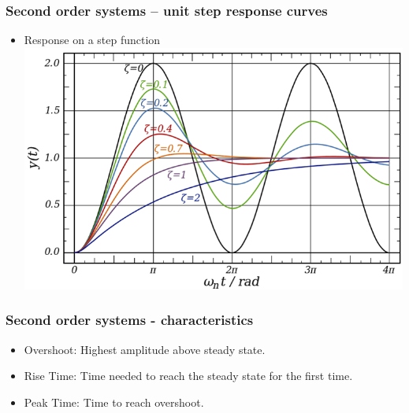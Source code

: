 \begin{frame}
\frametitle{Second order systems – unit step response curves}
\begin{itemize}
\item Response on a step function
\\ \vspace{1cm} \includegraphics[width=0.8\linewidth]{Afbeelding6}
\end{itemize}
\end{frame}

\begin{frame}
\frametitle{Second order systems - characteristics}
\begin{itemize}
\item Overshoot: Highest amplitude above steady state.
\vspace{0.15cm}
\item Rise Time: Time needed to reach the steady state for the first time.
\vspace{0.15cm}
\item Peak Time: Time to reach overshoot.
\\ \begin{figure}
\end{figure}
\end{itemize}
\end{frame}

